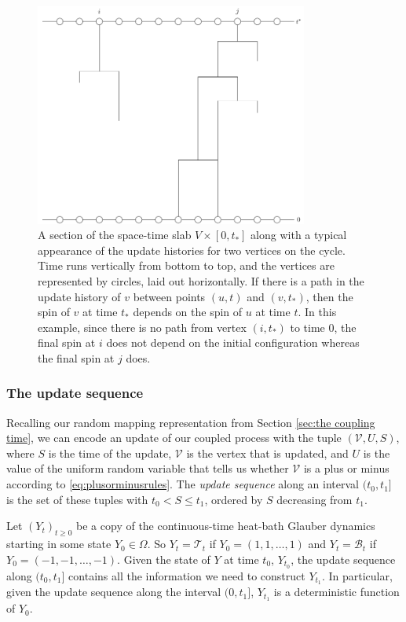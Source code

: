 	\begin{figure}
		\centering
		\includegraphics[width = 0.8\textwidth]{Figures/IsingCouplingTime/typical_percolation.pdf}
		\caption[Typical appearance of the update histories for two vertices on the cycle]{A section of the space-time slab $V \times [0, t_*]$ along with a typical appearance of the update histories for two vertices on the cycle. Time runs vertically from bottom to top, and the vertices are represented by circles, laid out horizontally. If there is a path in the update history of $v$ between points $(u, t)$ and $(v, t_*)$, then the spin of $v$ at time $t_*$ depends on the spin of $u$ at time $t$. In this example, since there is no path from vertex $(i, t_*)$ to time $0$, the final spin at $i$ does not depend on the initial configuration whereas the final spin at $j$ does.}
		\label{fig:typical percolation}
	\end{figure}

	\subsubsection{The update sequence}
	Recalling our random mapping representation from Section \ref{sec:the coupling time}, we can encode an update of our coupled process with the tuple $(\mathcal{V}, U, S)$, where $S$ is the time of the update, $\mathcal{V}$ is the vertex that is updated, and $U$ is the value of the uniform random variable that tells us whether $\mathcal{V}$ is a plus or minus according to \eqref{eq:plusorminusrules}. The \emph{update sequence} along an interval $(t_0, t_1]$ is the set of these tuples with $t_0 < S \leq t_1$, ordered by $S$ decreasing from $t_1$. 

	Let $(Y_t)_{t \geq 0}$ be a copy of the continuous-time heat-bath Glauber dynamics starting in some state $Y_0 \in \Omega$. So $Y_t = \mathscr{T}_t$ if $Y_0 = (1, 1, \dots, 1)$ and $Y_t = \mathscr{B}_t$ if $Y_0 = (-1, -1, \dots, -1)$. Given the state of $Y$ at time $t_0$, $Y_{t_0}$, the update sequence along $(t_0, t_1]$ contains all the information we need to construct $Y_{t_1}$. In particular, given the update sequence along the interval $(0, t_1]$, $Y_{t_1}$ is a deterministic function of $Y_0$.

